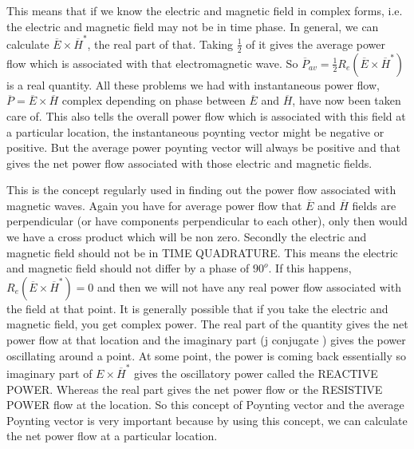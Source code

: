 This means that if we know the electric and magnetic field in complex forms, i.e. the electric and magnetic field may not be in time phase. In general, we can calculate $ \overline{E}\times\overline{H}^{*} $, the real part of that. Taking $ \frac{1}{2} $ of it gives the average power flow which is associated with that electromagnetic wave. So $\overline{P}_{av}=\frac{1}{2}R_{e}(\overline{E}\times\overline{H}^{*})$ is a real quantity. All these problems we had with instantaneous power flow, $ \overline{P}=\overline{E}\times\overline{H} $ complex depending on phase between $ \overline{E} $ and $ \overline{H} $, have now been taken care of. This also tells the overall power flow which is associated with this field at a particular location, the instantaneous poynting vector might be negative or positive. But the average power poynting vector will always be positive and that gives the net power flow associated with those electric and magnetic fields.

This is the concept regularly used in finding out the power flow associated with magnetic waves. Again you have for average power flow that $ \overline{E} $ and $ \overline{H} $ fields are perpendicular (or have components perpendicular to each other), only then would we have a cross product which will be non zero.
Secondly the electric and magnetic field should not be in TIME QUADRATURE. This means the electric and magnetic field should not differ by a phase of $90^{o}$. If this happens, $ R_{e}(\overline{E}\times\overline{H}^{*})=0 $ and then we will not have any real power flow associated with the field at that point. It is generally possible that if you take the electric and magnetic field, you get complex power. The real part of the quantity gives the net power flow at that location and the imaginary part (j conjugate ) gives the power oscillating around a point. At some point, the power is coming back essentially so imaginary part of $ E\times\overline{H}^{*} $ gives the oscillatory power called the REACTIVE POWER. Whereas the real part gives the net power flow or the RESISTIVE POWER flow at the location. So this concept of Poynting vector and the average Poynting vector is  very important because by using this concept, we can calculate the net power flow at a particular location.

